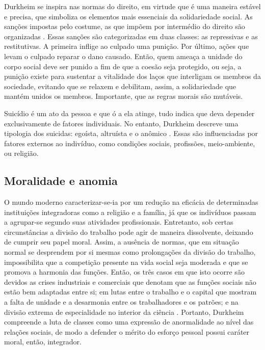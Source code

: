 Durkheim se inspira nas normas do direito, em virtude que é uma maneira estável e precisa, que simboliza os elementos mais essenciais da solidariedade social.
As sanções impostas pelo costume, as que impõem por intermédio do direito são organizadas \cite{quintaneiro2003toque}.
Essas sanções são categorizadas em duas classes: as repressivas e as restitutivas.
A primeira inflige ao culpado uma punição. 
Por último, ações que levam o culpado reparar o dano causado.
Então, quem ameaça a unidade do corpo social deve ser punido a fim de que a coesão seja protegido, ou seja, a punição existe para sustentar a vitalidade dos laços que interligam os membros da sociedade, evitando que se relaxem e debilitam, assim, a solidariedade que mantém unidos os membros. 
Importante, que as regras morais são mutáveis.

Suicídio é um ato da pessoa e que ó a ela atinge, tudo indica que deva depender exclusivamente de fatores individuais. No entanto, Durkheim descreve uma tipologia dos suicidas: egoísta, altruísta e o anômico \cite{quintaneiro2003toque}. 
Essas são influenciadas por fatores externos ao indivíduo, como condições sociais, profissões, meio-ambiente,  ou religião.


\subsection{Moralidade e anomia}

O mundo moderno caracterizar-se-ia por um redução na eficácia de determinadas instituições integradoras como a religião e a família, já que os indivíduos passam a agrupar-se segundo suas atividades profissionais. 
Entretanto, sob certas circunstâncias a divisão do trabalho pode agir de maneira dissolvente, deixando de cumprir seu papel moral.
Assim, a ausência de normas, que em situação normal se desprendem por si mesmas como prolongações da divisão do trabalho, impossibilita que a competição presente na vida social seja moderada e que se promova a harmonia das funções.
Então, os três casos em que isto ocorre são devidos as crises industriais e comerciais que denotam que as funções sociais não estão bem adaptadas entre si; em lutas entre o trabalho e o capital que mostram a falta de unidade e a desarmonia entre os trabalhadores e os patrões; e na divisão extrema de especialidade no interior da ciência \cite{quintaneiro2003toque}.
Portanto, Durkheim compreende a luta de classes como uma expressão de anormalidade ao nível das relações sociais, de modo a defender o mérito do esforço pessoal possui caráter moral, então, integrador.

